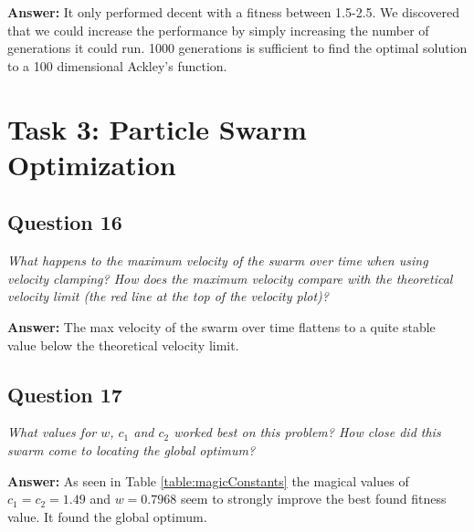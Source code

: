 \documentclass[a4paper]{article}
\begin{document}
\textbf{Answer:} It only performed decent with a fitness between 1.5-2.5. We discovered that we could increase the performance by simply increasing the number of generations it could run. 1000 generations is sufficient to find the optimal solution to a 100 dimensional Ackley's function.

\section*{Task 3: Particle Swarm Optimization}

\subsection*{Question 16}
\emph{What happens to the maximum velocity of the swarm over time
when using velocity clamping? How does the maximum velocity compare with
the theoretical velocity limit (the red line at the top of the velocity plot)?} 

\textbf{Answer:} The max velocity of the swarm over time flattens to a quite stable value below the theoretical velocity limit. 

\begin{table}[h]
\caption{Testing different magical constants}
\label{table:magicConstants}
\end{table}

\subsection*{Question 17}
\emph{What values for $w$, $c_1$ and $c_2$ worked best on this problem? How close did this swarm come to locating the global optimum?} 

\textbf{Answer:} As seen in Table \ref{table:magicConstants} the magical values of $c_1 = c_2 = 1.49$ and $w = 0.7968$ seem to strongly improve the best found fitness value. It found the global optimum. 
\end{document}
